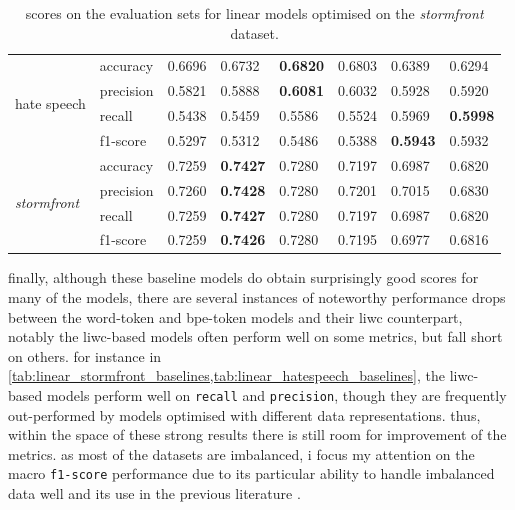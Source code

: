\begin{table}
{\begin{tabular}{ll|ll|ll|ll}
    \multirow{4}{*}{hate speech}          & accuracy  & 0.6696      & 0.6732        & \bf{0.6820} & 0.6803      & 0.6389      & 0.6294      \\
                                          & precision & 0.5821      & 0.5888        & \bf{0.6081} & 0.6032      & 0.5928      & 0.5920      \\
                                          & recall    & 0.5438      & 0.5459        & 0.5586      & 0.5524      & 0.5969      & \bf{0.5998} \\
                                          & f1-score  & 0.5297      & 0.5312        & 0.5486      & 0.5388      & \bf{0.5943} & 0.5932      \\\hline
    \multirow{4}{*}{\textit{stormfront}}  & accuracy  & 0.7259      & \bf{0.7427}   & 0.7280      & 0.7197      & 0.6987      & 0.6820      \\
                                          & precision & 0.7260      & \bf{0.7428}   & 0.7280      & 0.7201      & 0.7015      & 0.6830      \\
                                          & recall    & 0.7259      & \bf{0.7427}   & 0.7280      & 0.7197      & 0.6987      & 0.6820      \\
                                          & f1-score  & 0.7259      & \bf{0.7426}   & 0.7280      & 0.7195      & 0.6977      & 0.6816
    \end{tabular}%
    }
    \caption{scores on the evaluation sets for linear models optimised on the \textit{stormfront} dataset.}
    \label{tab:linear_stormfront_baselines}
\end{table}

finally, although these baseline models do obtain surprisingly good scores for many of the models, there are several instances of noteworthy performance drops between the word-token and bpe-token models and their liwc counterpart, notably the liwc-based models often perform well on some metrics, but fall short on others.
for instance in \cref{tab:linear_stormfront_baselines,tab:linear_hatespeech_baselines}, the liwc-based models perform well on \texttt{recall} and \texttt{precision}, though they are frequently out-performed by models optimised with different data representations.
thus, within the space of these strong results there is still room for improvement of the metrics.
as most of the datasets are imbalanced, i focus my attention on the macro \texttt{f1-score} performance due to its particular ability to handle imbalanced data well and its use in the previous literature \citep{fortuna:2021}.

